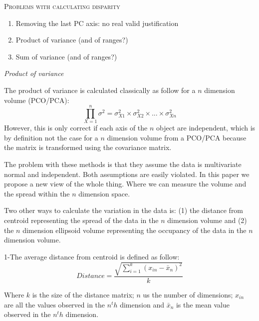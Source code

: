 \documentclass[12pt,letterpaper]{article}
\renewcommand{\section}[1]{%
\bigskip
\begin{center}
\begin{Large}
\normalfont\scshape #1
\medskip
\end{Large}
\end{center}}
\renewcommand{\subsection}[1]{%
\bigskip
\begin{center}
\begin{large}
\normalfont\itshape #1
\end{large}
\end{center}}
\begin{document}
\section{Problems with calculating disparity}

\begin{enumerate}
\item{Removing the last PC axis: no real valid justification}
\item{Product of variance (and of ranges?)}
\item{Sum of variance (and of ranges?)}
\end{enumerate}

\subsection{Product of variance}

The product of variance is calculated classically \cite{Wills1994} as follow for a $n$ dimension volume (PCO/PCA):
\begin{equation}
\prod\limits_{X=1}^n \sigma^2 = \sigma_{X1}^2 \times \sigma_{X2}^2 \times ... \times \sigma_{Xn}^2
\end{equation}
However, this is only correct if each axis of the $n$ object are independent, which is by definition not the case for a $n$ dimension volume from a PCO/PCA because the matrix is transformed using the covariance matrix. %

The problem with these methods is that they assume the data is multivariate normal and independent. Both assumptions are easily violated. In this paper we propose a new view of the whole thing. Where we can measure the volume and the spread within the $n$ dimension space.


Two other ways to calculate the variation in the data is: (1) the distance from centroid \cite{finlay2015morphological} representing the spread of the data in the $n$ dimension volume and (2) the $n$ dimension ellipsoid volume \cite{DonohueDim} representing the occupancy of the data in the $n$ dimension volume.

1-The average distance from centroid is defined as follow:
\begin{equation}
Distance=\frac{\sqrt{\sum\limits_{i=1}^k(x_{in}-\bar{x}_{n})^2}}{k}
\end{equation}

Where $k$ is the size of the distance matrix; $n$ us the number of dimensions; $x_{in}$ are all the values observed in the $n^th$ dimension and $\bar{x}_{n}$ is the mean value observed in the $n^th$ dimension.
\end{document}

